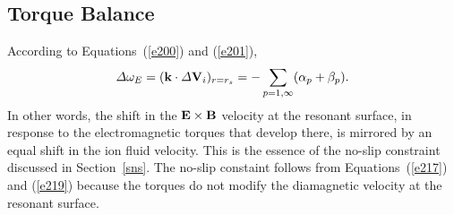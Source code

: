 \documentclass[notitlepage,12pt]{article}
\begin{document}
\subsection{Torque Balance}\label{stb}
According to Equations~(\ref{e200}) and (\ref{e201}),
\begin{equation}\label{e393}
{\mit\Delta}\omega_E = ({\bf k}\cdot{\mit\Delta}{\bf V}_i)_{r=r_s} = -\sum_{p=1,\infty}(\alpha_p+ \beta_p).
\end{equation}
In other words, the shift in the ${\bf E}\times {\bf B}$ velocity at the resonant surface, in response to the electromagnetic
torques that develop there, is mirrored by an equal  shift in the ion fluid velocity. This is the
essence of the no-slip constraint discussed in Section~\ref{sns}. The no-slip constaint follows from Equations~(\ref{e217}) and (\ref{e219})
because the torques do not modify the diamagnetic velocity at the resonant surface. 
\end{document}
